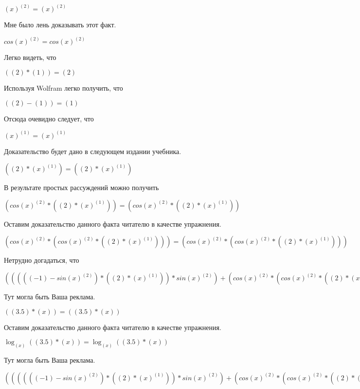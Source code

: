 \documentclass[12pt,a4paper,fleqn]{article}
\theoremstyle{definition}
\begin{document}
${( x )}^{( 2 )} = {( x )}^{( 2 )}$

Мне было лень доказывать этот факт.

$cos{( x )}^{( 2 )} = cos{( x )}^{( 2 )}$

Легко видеть, что

$(( 2 ) * ( 1 )) = ( 2 )$

Используя Wolfram легко получить, что

$(( 2 ) - ( 1 )) = ( 1 )$

Отсюда очевидно следует, что

${( x )}^{( 1 )} = {( x )}^{( 1 )}$

Доказательство будет дано в следующем издании учебника.

$(( 2 ) * {( x )}^{( 1 )}) = (( 2 ) * {( x )}^{( 1 )})$

В результате простых рассуждений можно получить

$(cos{( x )}^{( 2 )} * (( 2 ) * {( x )}^{( 1 )})) = (cos{( x )}^{( 2 )} * (( 2 ) * {( x )}^{( 1 )}))$

Оставим доказательство данного факта читателю в качестве упражнения.

$(cos{( x )}^{( 2 )} * (cos{( x )}^{( 2 )} * (( 2 ) * {( x )}^{( 1 )}))) = (cos{( x )}^{( 2 )} * (cos{( x )}^{( 2 )} * (( 2 ) * {( x )}^{( 1 )})))$

Нетрудно догадаться, что

$((((( -1 ) - sin{( x )}^{( 2 )}) * (( 2 ) * {( x )}^{( 1 )})) * sin{( x )}^{( 2 )}) + (cos{( x )}^{( 2 )} * (cos{( x )}^{( 2 )} * (( 2 ) * {( x )}^{( 1 )})))) = ((((( -1 ) - sin{( x )}^{( 2 )}) * (( 2 ) * {( x )}^{( 1 )})) * sin{( x )}^{( 2 )}) + (cos{( x )}^{( 2 )} * (cos{( x )}^{( 2 )} * (( 2 ) * {( x )}^{( 1 )}))))$

Тут могла быть Ваша реклама.

$(( 3.5 ) * ( x )) = (( 3.5 ) * ( x ))$

Оставим доказательство данного факта читателю в качестве упражнения.

$\log_{( x )}{(( 3.5 ) * ( x ))} = \log_{( x )}{(( 3.5 ) * ( x ))}$

Тут могла быть Ваша реклама.

$(((((( -1 ) - sin{( x )}^{( 2 )}) * (( 2 ) * {( x )}^{( 1 )})) * sin{( x )}^{( 2 )}) + (cos{( x )}^{( 2 )} * (cos{( x )}^{( 2 )} * (( 2 ) * {( x )}^{( 1 )})))) * \log_{( x )}{(( 3.5 ) * ( x ))}) = (((((( -1 ) - sin{( x )}^{( 2 )}) * (( 2 ) * {( x )}^{( 1 )})) * sin{( x )}^{( 2 )}) + (cos{( x )}^{( 2 )} * (cos{( x )}^{( 2 )} * (( 2 ) * {( x )}^{( 1 )})))) * \log_{( x )}{(( 3.5 ) * ( x ))})$
\end{document}
